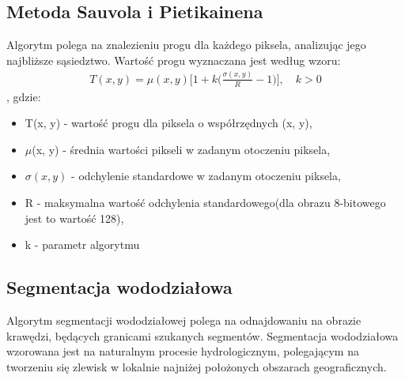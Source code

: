 \subsection{Metoda Sauvola i Pietikainena}
Algorytm polega na znalezieniu progu dla każdego piksela, analizując jego najbliższe sąsiedztwo. Wartość progu wyznaczana jest według wzoru:
\begin{gather*}
  T(x, y) = \mu(x, y)\Big[1+k\big(\frac{\sigma(x, y)}{R} - 1\big)\Big], \quad k > 0
\end{gather*},
gdzie:
\begin{itemize}
  \item T(x, y) - wartość progu dla piksela o współrzędnych (x, y),
  \item $\mu$(x, y) - średnia wartości pikseli w zadanym otoczeniu piksela,
  \item $\sigma(x, y)$ - odchylenie standardowe w zadanym otoczeniu piksela,
  \item R - maksymalna wartość odchylenia standardowego(dla obrazu 8-bitowego jest to wartość 128),
  \item k - parametr algorytmu
\end{itemize}
\subsection{Segmentacja wododziałowa}
Algorytm segmentacji wododziałowej polega na odnajdowaniu na obrazie krawędzi, będących granicami szukanych segmentów. Segmentacja wododziałowa wzorowana jest na naturalnym procesie hydrologicznym, polegającym na tworzeniu się zlewisk w lokalnie najniżej położonych obszarach geograficznych. \\
